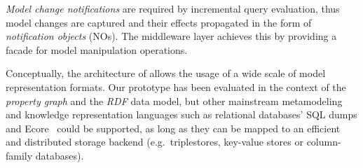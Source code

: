 \emph{Model change notifications} are required by incremental query evaluation, thus model changes are captured and their effects propagated in the form of \emph{notification objects} (NOs). The middleware layer achieves this by providing a facade for model manipulation operations. 

Conceptually, the architecture of \iqd{} allows the usage of a wide scale of model representation formats. Our prototype has been evaluated in the context of %
the \emph{property graph} and the \emph{RDF} data model, but other mainstream metamodeling and knowledge representation languages such as relational databases' SQL dumps and Ecore~\cite{EMF} could be supported, as long as they can be mapped to an efficient and distributed storage backend (e.g.\ triplestores, key-value stores or column-family databases).
